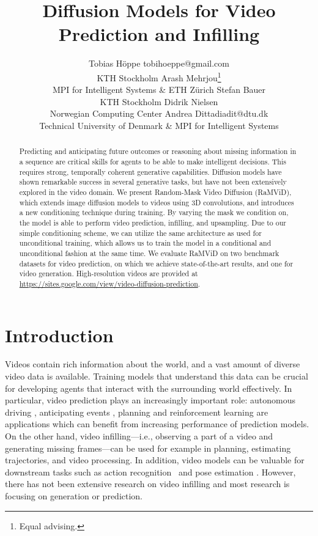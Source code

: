 \documentclass[10pt]{article} \usepackage[accepted]{tmlr}
\title{Diffusion Models for Video Prediction and Infilling}
\author{\name Tobias H\"oppe \email tobihoeppe@gmail.com \\
      \addr KTH Stockholm
      \AND
      \name Arash Mehrjou\thanks{Equal advising.} \\
      \addr MPI for Intelligent Systems  \&  ETH Z\"urich
      \AND
      \name Stefan Bauer\footnotemark[1] \\
      \addr KTH Stockholm 
      \AND
      \name Didrik Nielsen\footnotemark[1] \\
      \addr Norwegian Computing Center 
      \AND
      \name Andrea Dittadi\footnotemark[1] \email adit@dtu.dk \\
      \addr  Technical University of Denmark \& MPI for Intelligent Systems 
}
\begin{document}
\maketitle

\begin{abstract}
Predicting and anticipating future outcomes or reasoning about missing information in a sequence are critical skills for agents to be able to make intelligent decisions. This requires strong, temporally coherent generative capabilities. Diffusion models have shown remarkable success in several generative tasks, but have not been extensively explored in the video domain.
We present Random-Mask Video Diffusion (RaMViD), which extends image diffusion models to videos using 3D convolutions, and introduces a new conditioning technique during training.
By varying the mask we condition on, the model is able to perform video prediction, infilling, and upsampling. Due to our simple conditioning scheme, we can utilize the same architecture as used for unconditional training, which allows us to train the model in a conditional and unconditional fashion at the same time. We evaluate RaMViD on two benchmark datasets for video prediction, on which we achieve state-of-the-art results, and one for video generation. High-resolution videos are provided at \url{https://sites.google.com/view/video-diffusion-prediction}.
\end{abstract}

\section{Introduction}
\label{sec:intro}
Videos contain rich information about the world, and a vast amount of diverse video data is available. 
Training models that understand this data can be crucial for developing agents that interact with the surrounding world effectively. 
In particular, video prediction plays an increasingly important role: autonomous driving \citep{hu_2020}, anticipating events \citep{zeng_2017}, planning \citep{finn_2017} and reinforcement learning \citep{pmlr-v97-hafner19a} are applications which can benefit from increasing performance of prediction models. 
On the other hand, video infilling---i.e., observing a part of a video and generating missing frames---can be used for example in planning, estimating trajectories, and video processing.
In addition, video models can be valuable for downstream tasks such as action recognition~\citep{kong_2018_survey} and pose estimation \citep{sahin_2020_review}. However, there has not been extensive research on video infilling and most research is focusing on generation or prediction.
\end{document}
